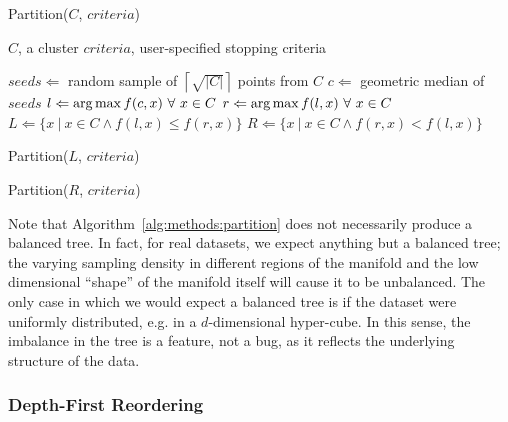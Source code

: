\begin{algorithm} %
    \caption{Partition($C$, $criteria$)} %
    \label{alg:methods:partition} %
    \begin{algorithmic}[0] %
        \Require $C$, a cluster
        \Require $criteria$, user-specified stopping criteria

        \State $seeds \Leftarrow$ random sample of $\left\lceil \sqrt{|C|} \right\rceil$ points from $C$
        \State $c \Leftarrow$ geometric median of $seeds$
        \State $l \Leftarrow \operatorname*{arg\,max} f(c, x) \ \forall \ x \in C$
        \State $r \Leftarrow \argmax f(l, x) \ \forall \ x \in C$
        \State $L \Leftarrow \{x \ | \ x \in C \land f(l, x) \le f(r, x)\}$
        \State $R \Leftarrow \{x \ | \ x \in C \land f(r, x) < f(l, x)\}$

            \State Partition($L$, $criteria$)
        \EndIf

            \State Partition($R$, $criteria$)
        \EndIf
    \end{algorithmic}
\end{algorithm}

Note that Algorithm~\ref{alg:methods:partition} does not necessarily produce a balanced tree.
In fact, for real datasets, we expect anything but a balanced tree; the varying sampling density in different regions of the manifold and the low dimensional ``shape'' of the manifold itself will cause it to be unbalanced.
The only case in which we would expect a balanced tree is if the dataset were uniformly distributed, e.g. in a $d$-dimensional hyper-cube.
In this sense, the imbalance in the tree is a feature, not a bug, as it reflects the underlying structure of the data.


\subsubsection{Depth-First Reordering}
\label{sec:methods:clustering:depth-first-reordering}


